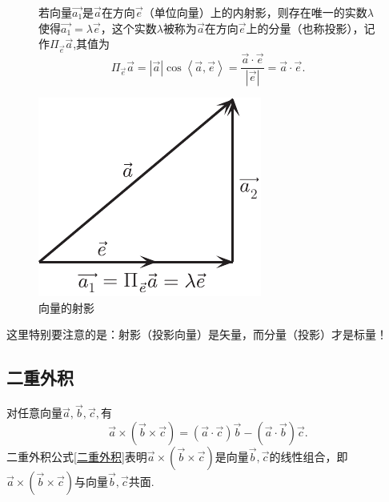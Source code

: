 \begin{figure}[h]
	\begin{minipage}{0.65\linewidth}
		\hspace*{0.3cm} 若向量$\overrightarrow{a_1}$是$\overrightarrow{a}$在方向$\overrightarrow{e}$（单位向量）上的内射影，则存在唯一的实数$\lambda $使得$\overrightarrow{a_1}=\lambda \overrightarrow{e}$，这个实数$\lambda $被称为$\overrightarrow{a}$在方向$\overrightarrow{e}$上的{\color{dy}分量（也称投影）}，记作$\Pi_{\overrightarrow{e}}\overrightarrow{a}$,其值为
		\begin{equation}
			\Pi_ {\overrightarrow{e}}\overrightarrow{a}=|\overrightarrow{a}|\cos \left\langle \overrightarrow{a},\overrightarrow{e}\right\rangle=\frac{\overrightarrow{a}\cdot \overrightarrow{e}}{|\overrightarrow{e}|}=\overrightarrow{a}\cdot \overrightarrow{e}.
		\end{equation}
		
	\end{minipage}
	\hfill
	\begin{minipage}{0.35\linewidth}
		\centering
		\includegraphics[width=0.7\linewidth]{picture/C-1/1.2/TY.pdf}
		\caption{向量的射影}
		\label{TY}
	\end{minipage}
\end{figure}
这里特别要注意的是：射影（投影向量）是矢量，而分量（投影）才是标量！\\
\vspace*{-2em}
\subsection{二重外积}

\ttheorem[二重外积公式]
对任意向量$\overrightarrow{a},\overrightarrow{b},\overrightarrow{c},$有
\begin{equation}
	\overrightarrow{a}\times\left( \overrightarrow{b}\times\overrightarrow{c}\right) =\left( \overrightarrow{a}\cdot \overrightarrow{c}\right)\overrightarrow{b}-\left( \overrightarrow{a}\cdot  \overrightarrow{b}\right)\overrightarrow{c}.  
	\label{二重外积}
\end{equation}
\qquad  二重外积公式\eqref{二重外积}表明$\overrightarrow{a}\times\left( \overrightarrow{b}\times\overrightarrow{c}\right)$是向量$\overrightarrow{b},\overrightarrow{c}$的线性组合，即$\overrightarrow{a}\times\left( \overrightarrow{b}\times\overrightarrow{c}\right)$与向量$\overrightarrow{b},\overrightarrow{c}$共面. 

